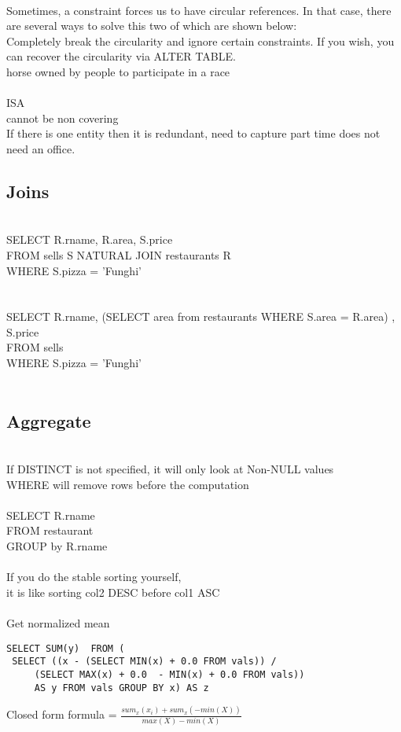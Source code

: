 \documentclass[11pt]{article}
\begin{document}
\\
Sometimes, a constraint forces us to have circular references.  In that case, there are several ways to solve this two of which are shown below:
\\
Completely break the circularity and ignore certain constraints.
If you wish, you can recover the circularity via ALTER TABLE.
\\
horse owned by people to participate in a race
\\\\
ISA\\ 
cannot be non covering\\
If there is one entity then it is redundant, need to capture part time does not need an office.
\\
\subsection*{Joins}\\
SELECT R.rname, R.area, S.price\\
FROM sells S NATURAL JOIN restaurants R\\
WHERE S.pizza = 'Funghi'\\
\\\\
SELECT R.rname, (SELECT area from restaurants WHERE S.area = R.area) , S.price\\
FROM sells \\
WHERE S.pizza = 'Funghi'\\\\
\subsection*{Aggregate}\\
If DISTINCT is not specified, it will only look at Non-NULL values\\
WHERE will remove rows before the computation\\
\\
SELECT R.rname\\
FROM restaurant \\
GROUP by R.rname\\
\\
If you do the stable sorting yourself,\\
it is like sorting col2 DESC before col1 ASC
\\
\\
Get normalized mean
\begin{verbatim}
SELECT SUM(y)  FROM (
 SELECT ((x - (SELECT MIN(x) + 0.0 FROM vals)) /
	 (SELECT MAX(x) + 0.0  - MIN(x) + 0.0 FROM vals))  
	 AS y FROM vals GROUP BY x) AS z
\end{verbatim}
Closed form formula = $\frac{sum_{x}(x_{i}) + sum_{x} (-min(X))}{max(X) - min(X)}$
\end{document}
